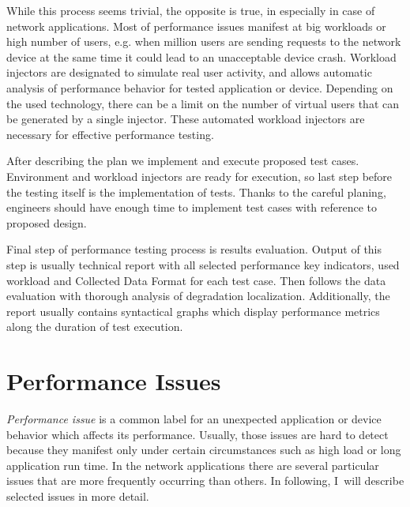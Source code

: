 While this process seems trivial, the opposite is true, in especially in case of network applications. Most of performance issues manifest at big workloads or high number of users, e.g. when million users are sending requests to the network device at the same time it could lead to an unacceptable device crash. Workload injectors are designated to simulate real user activity, and allows automatic analysis of performance behavior for tested application or device. Depending on the used technology, there can be a limit on the number of virtual users that can be generated by a single injector. These automated workload injectors are necessary for effective performance testing.

After describing the plan we implement and execute proposed test cases. Environment and workload injectors are ready for execution, so last step before the testing itself is the implementation of tests. Thanks to the careful planing, engineers should have enough time to implement test cases with reference to proposed design.

Final step of performance testing process is results evaluation. Output of this step is usually technical report with all selected performance key indicators, used workload and Collected Data Format for each test case. Then follows the data evaluation with thorough analysis of degradation localization. Additionally, the report usually contains syntactical graphs which display performance metrics along the duration of test execution.

\section{Performance Issues}
\label{Performance Issues}
\emph{Performance issue} is a common label for an unexpected application or device behavior which affects its performance. Usually, those issues are hard to detect because they manifest only under certain circumstances such as high load or long application run time. In the network applications there are several particular issues that are more frequently occurring  than others. In following, I~will describe selected issues in more detail.

